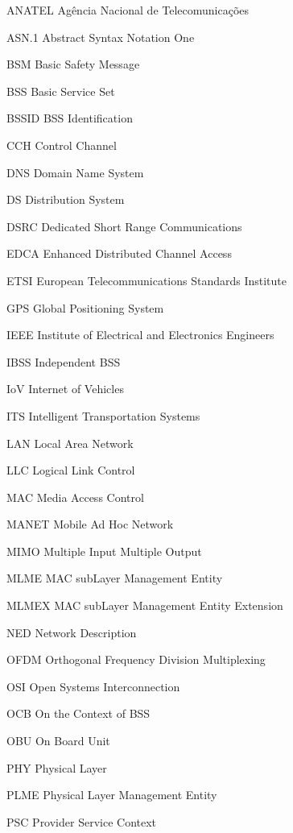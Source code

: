 \documentclass[
12pt,				%
openright,			%
oneside,			%
a4paper,			%
brazil,				%
]{abntex2}
\begin{document}
	\begin{siglas}
		\item[ANATEL] Agência Nacional de Telecomunicações
		\item[ASN.1] Abstract Syntax Notation One
		\item[BSM] Basic Safety Message
		\item[BSS] Basic Service Set
		\item[BSSID] BSS Identification
		\item[CCH] Control Channel
		\item[DNS] Domain Name System
		\item[DS] Distribution System
		\item[DSRC] Dedicated Short Range Communications
		\item[EDCA] Enhanced Distributed Channel Access
		\item[ETSI] European Telecommunications Standards Institute
		\item[GPS] Global Positioning System
		\item[IEEE] Institute of Electrical and Electronics Engineers
		\item[IBSS] Independent BSS 
		\item[IoV] Internet of Vehicles
		\item[ITS] Intelligent Transportation Systems 
		\item[LAN] Local Area Network
		\item[LLC] Logical Link Control
		\item[MAC] Media Access Control
		\item[MANET] Mobile Ad Hoc Network
		\item[MIMO] Multiple Input Multiple Output
		\item[MLME] MAC subLayer Management Entity
		\item[MLMEX] MAC subLayer Management Entity Extension
		\item[NED] Network Description
		\item[OFDM] Orthogonal Frequency Division Multiplexing
		\item[OSI] Open Systems Interconnection 
		\item[OCB] On the Context of BSS
		\item[OBU] On Board Unit
		\item[PHY] Physical Layer
		\item[PLME] Physical Layer Management Entity
		\item[PSC] Provider Service Context 

\end{siglas}
\end{document}
